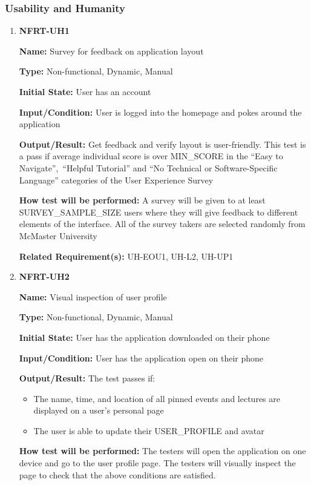\documentclass[12pt, titlepage]{article}
\begin{document}
\subsubsection{Usability and Humanity}

\begin{enumerate}
\item{\textbf{NFRT-UH1}}

\textbf{Name:} Survey for feedback on application layout

\textbf{Type:} Non-functional, Dynamic, Manual
					
\textbf{Initial State:} User has an account

\textbf{Input/Condition:} User is logged into the homepage and pokes around the application
					
\textbf{Output/Result:} Get feedback and verify layout is user-friendly. This test is a pass if average individual score is over MIN\_SCORE in the ``Easy to Navigate'',\
``Helpful Tutorial'' and ``No Technical or Software-Specific Language'' categories of the User Experience Survey
					
\textbf{How test will be performed:} A survey will be given to at least
SURVEY\_SAMPLE\_SIZE users where they will give feedback to different elements of the interface. All of the survey takers are selected randomly from McMaster University

\textbf{Related Requirement(s):} UH-EOU1, UH-L2, UH-UP1

\item{\textbf{NFRT-UH2}}

\textbf{Name:} Visual inspection of user profile

\textbf{Type:} Non-functional, Dynamic, Manual
					
\textbf{Initial State:} User has the application downloaded on their phone
					
\textbf{Input/Condition:} User has the application open on their phone
					
\textbf{Output/Result:} The test passes if:
\begin{itemize}
  \item The name, time, and location of all pinned events and lectures are displayed on a user's personal page
  \item The user is able to update their USER\_PROFILE and avatar
\end{itemize}

\textbf{How test will be performed:} The testers will open the application on one device and go to the user profile page. The testers will visually inspect the page to check that the above conditions are satisfied.


\end{enumerate}
\end{document}
